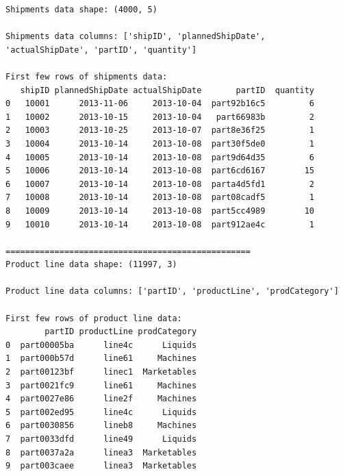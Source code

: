 \documentclass[
]{article}
\begin{document}
\begin{verbatim}
Shipments data shape: (4000, 5)

Shipments data columns: ['shipID', 'plannedShipDate', 'actualShipDate', 'partID', 'quantity']

First few rows of shipments data:
   shipID plannedShipDate actualShipDate       partID  quantity
0   10001      2013-11-06     2013-10-04  part92b16c5         6
1   10002      2013-10-15     2013-10-04   part66983b         2
2   10003      2013-10-25     2013-10-07  part8e36f25         1
3   10004      2013-10-14     2013-10-08  part30f5de0         1
4   10005      2013-10-14     2013-10-08  part9d64d35         6
5   10006      2013-10-14     2013-10-08  part6cd6167        15
6   10007      2013-10-14     2013-10-08  parta4d5fd1         2
7   10008      2013-10-14     2013-10-08  part08cadf5         1
8   10009      2013-10-14     2013-10-08  part5cc4989        10
9   10010      2013-10-14     2013-10-08  part912ae4c         1

==================================================
Product line data shape: (11997, 3)

Product line data columns: ['partID', 'productLine', 'prodCategory']

First few rows of product line data:
        partID productLine prodCategory
0  part00005ba      line4c      Liquids
1  part000b57d      line61     Machines
2  part00123bf      linec1  Marketables
3  part0021fc9      line61     Machines
4  part0027e86      line2f     Machines
5  part002ed95      line4c      Liquids
6  part0030856      lineb8     Machines
7  part0033dfd      line49      Liquids
8  part0037a2a      linea3  Marketables
9  part003caee      linea3  Marketables
\end{verbatim}
\end{document}
